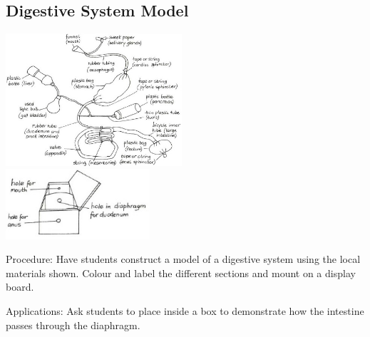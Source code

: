 \begin{multicols}{2}
\vfill
\columnbreak

\subsection{Digestive System Model} %

\begin{center}
\includegraphics[width=0.49\textwidth]{./img/vso/digestive-sys-model.jpg} \\[6pt]
\includegraphics[width=0.4\textwidth]{./img/vso/digestive-sys-model-2.jpg}
\end{center}

\begin{description*}
\item[Procedure:]{Have students construct a model of a digestive system using the local materials shown. Colour and label the different sections and mount on a display board. }
\item[Applications:]{Ask students to place inside a box to demonstrate how the intestine passes through the diaphragm.}
\end{description*}


\end{multicols}

